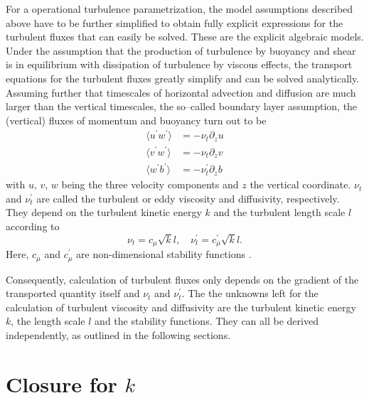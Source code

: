 For a operational turbulence parametrization, the model assumptions described 
above have to be further simplified to obtain fully explicit expressions for 
the 
turbulent fluxes that can easily be solved. These are the explicit algebraic 
models. Under the assumption that the production of turbulence by buoyancy and 
shear is in equilibrium with dissipation of turbulence by viscous effects, the 
transport equations for the turbulent fluxes greatly simplify and can be solved 
analytically. Assuming further that timescales of horizontal advection and 
diffusion are much larger than the vertical timescales, the so--called boundary 
layer assumption, the (vertical) fluxes of momentum and buoyancy turn out to be 
\begin{align}
 \label{bblassum}
 \langle u^\prime w^\prime \rangle &= - \nu_t \partial_z u \\
 \langle v^\prime w^\prime \rangle &= - \nu_t \partial_z v \\
 \langle w^\prime b^\prime \rangle &= - \nu_t^\prime \partial_z b
\end{align}
with $u,\,v,\,w$ being the three velocity components and $z$ the vertical 
coordinate. $\nu_t$ and $\nu_t^\prime$ are called the turbulent or eddy 
viscosity and diffusivity, respectively. They depend on the turbulent kinetic 
energy $k$ and the turbulent length scale $l$ according to
\begin{equation}
 \label{turbdiff}
 \nu_t = c_\mu \sqrt{k} l, \quad \nu_t^\prime = c_\mu^\prime \sqrt{k} l.
\end{equation}
Here, $c_\mu$ and $c_\mu^\prime$ are non-dimensional stability 
functions \citep[][]{gotm1999}.

Consequently, calculation of turbulent fluxes only depends on the gradient of 
the transported quantity itself and $\nu_t$ and $\nu_t^\prime$. The the 
unknowns left for the calculation of turbulent viscosity and 
diffusivity are the turbulent kinetic energy $k$, the length scale $l$ and the 
stability functions. They can all be derived independently, as outlined in the 
following sections.

\section{Closure for $k$ }\label{kclosure}

